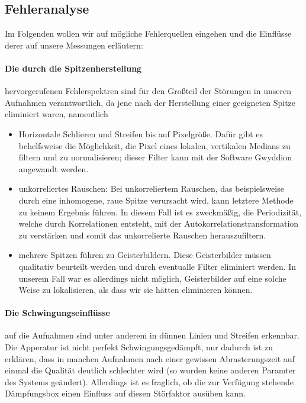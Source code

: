 \subsection{Fehleranalyse}
Im Folgenden wollen wir auf mögliche Fehlerquellen eingehen und die Einflüsse derer
auf unsere Messungen erläutern:
\paragraph{Die durch die Spitzenherstellung} hervorgerufenen Fehlerspektren sind für 
den Großteil der Störungen in unseren Aufnahmen verantwortlich, da jene nach der Herstellung
einer geeigneten Spitze eliminiert waren, namentlich
\begin{itemize}
        \item Horizontale Schlieren und Streifen bis auf Pixelgröße. Dafür gibt 
            es behelfsweise die Möglichkeit, die Pixel eines lokalen, vertikalen Medians
            zu filtern und zu normalisieren; dieser Filter kann mit der Software Gwyddion
            angewandt werden.

        \item unkorreliertes Rauschen: Bei unkorreliertem Rauschen, das beispielsweise durch
            eine inhomogene, raue Spitze verursacht wird, kann letztere Methode zu keinem
            Ergebnis führen. In diesem Fall ist es zweckmäßig, die Periodizität, welche
            durch Korrelationen entsteht, mit der Autokorrelationstransformation zu verstärken
            und somit das unkorrelierte Rauschen herauszufiltern.
        \item mehrere Spitzen führen zu Geisterbildern. Diese Geisterbilder müssen qualitativ
            beurteilt werden und durch eventualle Filter eliminiert werden. In unserem
            Fall war es allerdings nicht möglich, Geisterbilder auf eine solche Weise
            zu lokalisieren, als dass wir sie hätten eliminieren können.
\end{itemize}
\paragraph{Die Schwingungseinflüsse} auf die Aufnahmen sind unter anderem in dünnen Linien
und Streifen erkennbar. Die Apperatur ist nicht perfekt Schwingungsgedämpft, nur dadurch
ist zu erklären, dass in manchen Aufnahmen nach einer gewissen Abrasterungszeit auf einmal
die Qualität deutlich schlechter wird (so wurden keine anderen Paramter des Systems geändert).
Allerdings ist es fraglich, ob die zur Verfügung stehende Dämpfungsbox einen Einfluss
auf diesen Störfaktor ausüben kann. 
